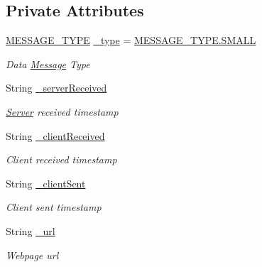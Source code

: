 \subsection*{Private Attributes}
\begin{DoxyCompactItemize}
\item 
\hyperlink{class_web_analyzer_1_1_models_1_1_message_model_1_1_in_data_message_a5c01620a5429c5eec75477e614c96f94}{M\+E\+S\+S\+A\+G\+E\+\_\+\+T\+Y\+P\+E} \hyperlink{class_web_analyzer_1_1_models_1_1_message_model_1_1_in_data_message_a4ec7837996a85d6843efb68bb7a7212f}{\+\_\+type} = \hyperlink{class_web_analyzer_1_1_models_1_1_message_model_1_1_in_data_message_a5c01620a5429c5eec75477e614c96f94a9b9c17e13f0e3dc9860a26e08b59b2a7}{M\+E\+S\+S\+A\+G\+E\+\_\+\+T\+Y\+P\+E.\+S\+M\+A\+L\+L}
\begin{DoxyCompactList}\small\item\em Data \hyperlink{class_web_analyzer_1_1_models_1_1_message_model_1_1_message}{Message} Type \end{DoxyCompactList}\item 
String \hyperlink{class_web_analyzer_1_1_models_1_1_message_model_1_1_in_data_message_ae7aa4bcdfbb85dea10b2bd9eb2065e55}{\+\_\+server\+Received}
\begin{DoxyCompactList}\small\item\em \hyperlink{namespace_web_analyzer_1_1_server}{Server} received timestamp \end{DoxyCompactList}\item 
String \hyperlink{class_web_analyzer_1_1_models_1_1_message_model_1_1_in_data_message_a2cc19c547d536622b261fc8798e59dca}{\+\_\+client\+Received}
\begin{DoxyCompactList}\small\item\em Client received timestamp \end{DoxyCompactList}\item 
String \hyperlink{class_web_analyzer_1_1_models_1_1_message_model_1_1_in_data_message_ae2ac2367bd8e3d621aec791d923481f5}{\+\_\+client\+Sent}
\begin{DoxyCompactList}\small\item\em Client sent timestamp \end{DoxyCompactList}\item 
String \hyperlink{class_web_analyzer_1_1_models_1_1_message_model_1_1_in_data_message_a8043e2e1b5fabe11fdcfe0c5dc2fee68}{\+\_\+url}
\begin{DoxyCompactList}\small\item\em Webpage url \end{DoxyCompactList}\item 

\end{DoxyCompactItemize}

